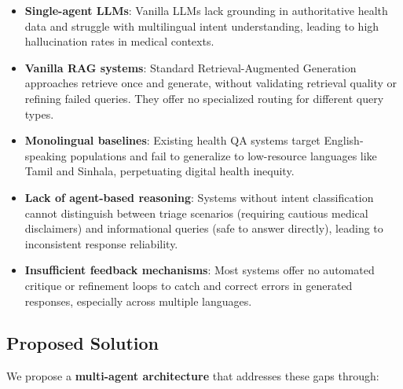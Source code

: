 \documentclass[11pt,a4paper]{article}
\begin{document}
\begin{itemize}
    \item \textbf{Single-agent LLMs}: Vanilla LLMs lack grounding in authoritative health data and struggle with multilingual intent understanding, leading to high hallucination rates in medical contexts.
    
    \item \textbf{Vanilla RAG systems}: Standard Retrieval-Augmented Generation approaches retrieve once and generate, without validating retrieval quality or refining failed queries. They offer no specialized routing for different query types.
    
    \item \textbf{Monolingual baselines}: Existing health QA systems target English-speaking populations and fail to generalize to low-resource languages like Tamil and Sinhala, perpetuating digital health inequity.
    
    \item \textbf{Lack of agent-based reasoning}: Systems without intent classification cannot distinguish between triage scenarios (requiring cautious medical disclaimers) and informational queries (safe to answer directly), leading to inconsistent response reliability.
    
    \item \textbf{Insufficient feedback mechanisms}: Most systems offer no automated critique or refinement loops to catch and correct errors in generated responses, especially across multiple languages.
\end{itemize}

\subsection{Proposed Solution}
\label{sec:solution}

We propose a \textbf{multi-agent architecture} that addresses these gaps through:
\end{document}
